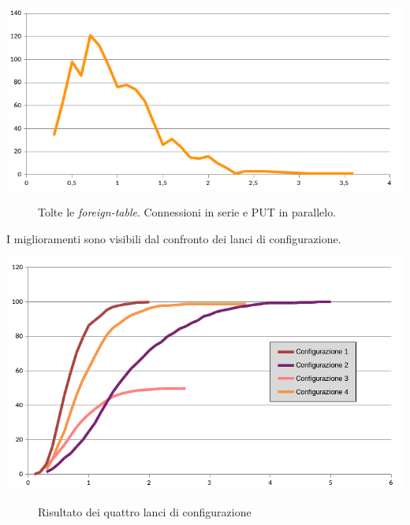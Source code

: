 \begin{center}
\includegraphics[scale=0.70]{img/round4b.png}
\end{center}
\begin{figure}[htbp]
\caption{Tolte le \textit{foreign-table}. Connessioni in serie e PUT in parallelo. \label{figura1.15}}
\end{figure}

I miglioramenti sono visibili dal confronto dei lanci di configurazione.

\begin{center}
\includegraphics[scale=0.70]{img/comparison1.png}
\end{center}
\begin{figure}[htbp]
\caption{Risultato dei quattro lanci di configurazione \label{figura1.15}}
\end{figure}

\item
